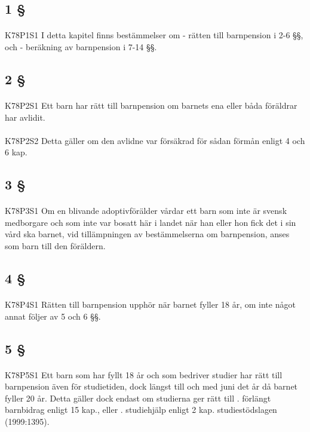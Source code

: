 \documentclass[a4paper,notitlepage,openany,10pt]{book}
\begin{document}
\subsection*{1 §}
\paragraph*{}
{\tiny K78P1S1}
I detta kapitel finns bestämmelser om
\newline - rätten till barnpension i 2-6 §§, och
\newline - beräkning av barnpension i 7-14 §§.
\subsection*{2 §}
\paragraph*{}
{\tiny K78P2S1}
Ett barn har rätt till barnpension om barnets ena eller båda föräldrar har avlidit.
\paragraph*{}
{\tiny K78P2S2}
Detta gäller om den avlidne var försäkrad för sådan förmån enligt 4 och 6 kap.
\subsection*{3 §}
\paragraph*{}
{\tiny K78P3S1}
Om en blivande adoptivförälder vårdar ett barn som inte är svensk medborgare och som inte var bosatt här i landet när han eller hon fick det i sin vård ska barnet, vid tillämpningen av bestämmelserna om barnpension, anses som barn till den föräldern.
\subsection*{4 §}
\paragraph*{}
{\tiny K78P4S1}
Rätten till barnpension upphör när barnet fyller 18 år, om inte något annat följer av 5 och 6 §§.
\subsection*{5 §}
\paragraph*{}
{\tiny K78P5S1}
Ett barn som har fyllt 18 år och som bedriver studier har rätt till barnpension även för studietiden, dock längst till och med juni det år då barnet fyller 20 år. Detta gäller dock endast om studierna ger rätt till
. förlängt barnbidrag enligt 15 kap., eller
. studiehjälp enligt 2 kap. studiestödslagen (1999:1395).
\end{document}
